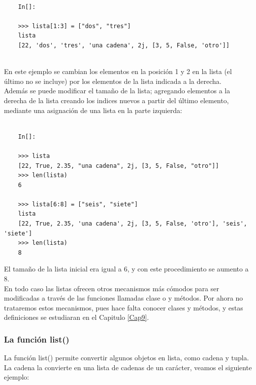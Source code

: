 \begin{lstlisting}
	
	In[]:
	
	>>> lista[1:3] = ["dos", "tres"]
	lista
	[22, 'dos', 'tres', 'una cadena', 2j, [3, 5, False, 'otro']]
	
\end{lstlisting} En este ejemplo se cambian los elementos en la posición 1 y 2 en la lista (el último no se incluye) por los elementos de la lista indicada a la derecha.\\



Además se puede modificar el tamaño de la lista; agregando elementos a la derecha de la lista creando los indices nuevos a partir del último elemento,   mediante una asignación de una lista en la parte izquierda:
\begin{lstlisting}
	
	In[]:
	
	>>> lista
	[22, True, 2.35, "una cadena", 2j, [3, 5, False, "otro"]]
	>>> len(lista)
	6
	
	>>> lista[6:8] = ["seis", "siete"]
	lista
	[22, True, 2.35, 'una cadena', 2j, [3, 5, False, 'otro'], 'seis', 'siete']
	>>> len(lista)
	8
\end{lstlisting}
El tamaño de la lista inicial era igual a 6, y con este procedimiento se aumento a 8.\\


En todo caso las listas ofrecen otros mecanismos más cómodos para ser modificadas a través de las funciones llamadas clase o y  métodos. Por ahora  no trataremos estos mecanismos, pues hace falta conocer  clases y  métodos, y estas definiciones se estudiaran en el Capitulo \ref{Cap9}.\\


\subsubsection{La función list()}  
La función {\ttfamily list()} permite convertir algunos objetos en lista, como  cadena y  tupla. 
La cadena la convierte en una lista de cadenas de un carácter, veamos el siguiente ejemplo:   


